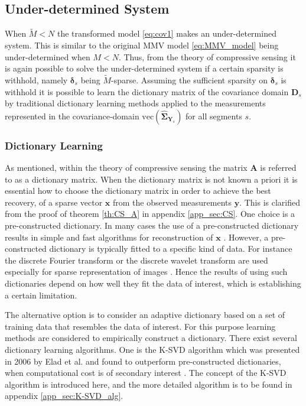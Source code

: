 \subsection{Under-determined System}\label{sec:cov1}
When $\widetilde{M} < N$ the transformed model \eqref{eq:cov1} makes an under-determined system.   
This is similar to the original MMV model \eqref{eq:MMV_model} being under-determined when $M < N$. 
Thus, from the theory of compressive sensing it is again possible to solve the under-determined system if a certain sparsity is withhold, namely $\boldsymbol{\delta}_s$ being $\widetilde{M}$-sparse.
Assuming the sufficient sparsity on $\boldsymbol{\delta}_s$ is withhold it is possible to learn the dictionary matrix of the covariance domain $\mathbf{D}_s$ by traditional dictionary learning methods applied to the measurements represented in the covariance-domain $\text{vec}\left(\widehat{\boldsymbol{\Sigma}}_{\mathbf{Y}_s}\right)$ for all segments $s$.

\subsubsection{Dictionary Learning}\label{sec:dictionarylearning}
As mentioned, within the theory of compressive sensing the matrix $\mathbf{A}$ is referred to as a dictionary matrix. 
When the dictionary matrix is not known a priori it is essential how to choose the dictionary matrix in order to achieve the best recovery, of a sparse vector $\mathbf{x}$ from the observed measurements $\mathbf{y}$. 
This is clarified from the proof of theorem \ref{th:CS_A} in appendix \ref{app_sec:CS}. 
One choice is a pre-constructed dictionary. 
In many cases the use of a pre-constructed dictionary results in simple and fast algorithms for reconstruction of $\mathbf{x}$ \cite{Elad_book}. 
However, a pre-constructed dictionary is typically fitted to a specific kind of data. 
For instance the discrete Fourier transform or the discrete wavelet transform are used especially for sparse representation of images \cite{Elad_book}. 
Hence the results of using such dictionaries depend on how well they fit the data of interest, which is establishing a certain limitation. 

The alternative option is to consider an adaptive dictionary based on a set of training data that resembles the data of interest. 
For this purpose learning methods are considered to empirically construct a dictionary. 
There exist several dictionary learning algorithms. One is the K-SVD algorithm which was presented in 2006 by Elad et al. and found to outperform pre-constructed dictionaries, when computational cost is of secondary interest \cite{Elad2006}. 
The concept of the K-SVD algorithm is introduced here, and the more detailed algorithm is to be found in appendix \ref{app_sec:K-SVD_alg}. 

